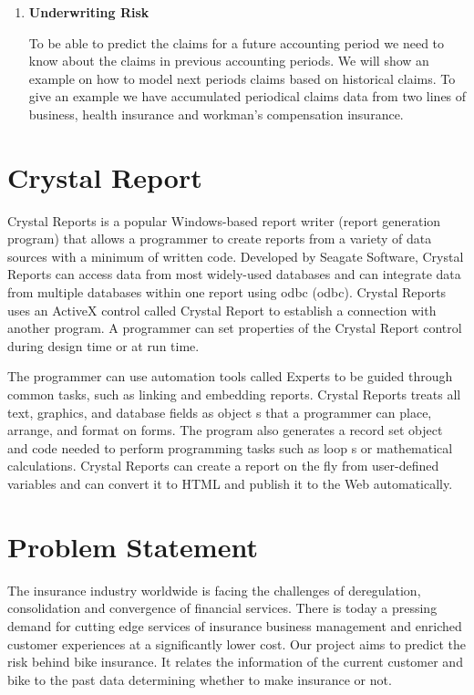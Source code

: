 \begin{enumerate}
\item \textbf{Underwriting Risk}
\par
To be able to predict the claims for a future accounting period we need to know about the claims in previous accounting periods. We will show an example on how to model next periods claims based on historical claims. To give an example we have accumulated periodical claims data from two lines of business, health insurance and workman’s compensation insurance.

\end{enumerate}

\section{Crystal Report}
Crystal Reports is a popular Windows-based report writer (report generation program) that allows a programmer to create reports from a variety of data sources with a minimum of written code. Developed by Seagate Software, Crystal Reports can access data from most widely-used databases and can integrate data from multiple databases within one report using \acl{odbc} (\acs{odbc}). Crystal Reports uses an ActiveX control called Crystal Report to establish a connection with another program. A programmer can set properties of the Crystal Report control during design time or at run time.
\par
The programmer can use automation tools called Experts to be guided through common tasks, such as linking and embedding reports. Crystal Reports treats all text, graphics, and database fields as object s that a programmer can place, arrange, and format on forms. The program also generates a record set object and code needed to perform programming tasks such as loop s or mathematical calculations. Crystal Reports can create a report on the fly from user-defined variables and can convert it to HTML and publish it to the Web automatically. 

\section{Problem Statement}
The insurance industry worldwide is facing the challenges of deregulation, consolidation and convergence of financial services. There is today a pressing demand for cutting edge services of insurance business management and enriched customer experiences at a significantly lower cost. Our project aims to predict the risk behind bike insurance. It relates the information of the current customer and bike to the past data determining whether to make insurance or not.

